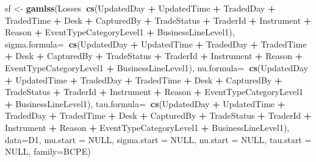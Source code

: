 \documentclass[]{article}
\newenvironment{Shaded}{\begin{snugshade}}{\end{snugshade}}
\newcommand{\KeywordTok}[1]{\textcolor[rgb]{0.13,0.29,0.53}{\textbf{#1}}}
\newcommand{\DataTypeTok}[1]{\textcolor[rgb]{0.13,0.29,0.53}{#1}}
\newcommand{\StringTok}[1]{\textcolor[rgb]{0.31,0.60,0.02}{#1}}
\newcommand{\OtherTok}[1]{\textcolor[rgb]{0.56,0.35,0.01}{#1}}
\newcommand{\OperatorTok}[1]{\textcolor[rgb]{0.81,0.36,0.00}{\textbf{#1}}}
\newcommand{\NormalTok}[1]{#1}
\begin{document}
\begin{Shaded}
\begin{Highlighting}[]
\NormalTok{sf <-}\StringTok{ }\KeywordTok{gamlss}\NormalTok{(Losses}\OperatorTok{~}\KeywordTok{cs}\NormalTok{(UpdatedDay }\OperatorTok{+}\StringTok{ }\NormalTok{UpdatedTime }\OperatorTok{+}\StringTok{ }\NormalTok{TradedDay }\OperatorTok{+}\StringTok{ }\NormalTok{TradedTime}
      \OperatorTok{+}\StringTok{ }\NormalTok{Desk }\OperatorTok{+}\StringTok{ }\NormalTok{CapturedBy }\OperatorTok{+}\StringTok{ }\NormalTok{TradeStatus }\OperatorTok{+}\StringTok{ }\NormalTok{TraderId }\OperatorTok{+}\StringTok{ }\NormalTok{Instrument }\OperatorTok{+}\StringTok{ }\NormalTok{Reason}
      \OperatorTok{+}\StringTok{ }\NormalTok{EventTypeCategoryLevel1 }\OperatorTok{+}\StringTok{ }\NormalTok{BusinessLineLevel1), }
\DataTypeTok{sigma.formula=}\OperatorTok{~}\KeywordTok{cs}\NormalTok{(UpdatedDay }\OperatorTok{+}\StringTok{ }\NormalTok{UpdatedTime }\OperatorTok{+}\StringTok{ }\NormalTok{TradedDay }\OperatorTok{+}\StringTok{ }\NormalTok{TradedTime }\OperatorTok{+}\StringTok{ }\NormalTok{Desk}
      \OperatorTok{+}\StringTok{ }\NormalTok{CapturedBy }\OperatorTok{+}\StringTok{ }\NormalTok{TradeStatus }\OperatorTok{+}\StringTok{ }\NormalTok{TraderId }\OperatorTok{+}\StringTok{ }\NormalTok{Instrument }\OperatorTok{+}\StringTok{ }\NormalTok{Reason }\OperatorTok{+}
\StringTok{        }\NormalTok{EventTypeCategoryLevel1 }\OperatorTok{+}\StringTok{ }\NormalTok{BusinessLineLevel1),}
\DataTypeTok{nu.formula=}\OperatorTok{~}\KeywordTok{cs}\NormalTok{(UpdatedDay }\OperatorTok{+}\StringTok{ }\NormalTok{UpdatedTime }\OperatorTok{+}\StringTok{ }\NormalTok{TradedDay }\OperatorTok{+}\StringTok{ }\NormalTok{TradedTime }\OperatorTok{+}\StringTok{ }\NormalTok{Desk }\OperatorTok{+}\StringTok{ }
\StringTok{      }\NormalTok{CapturedBy }\OperatorTok{+}\StringTok{ }\NormalTok{TradeStatus }\OperatorTok{+}\StringTok{ }\NormalTok{TraderId }\OperatorTok{+}\StringTok{ }\NormalTok{Instrument }\OperatorTok{+}\StringTok{ }\NormalTok{Reason }\OperatorTok{+}\StringTok{ }
\StringTok{      }\NormalTok{EventTypeCategoryLevel1 }\OperatorTok{+}\StringTok{ }\NormalTok{BusinessLineLevel1),}
 \DataTypeTok{tau.formula=}\OperatorTok{~}\KeywordTok{cs}\NormalTok{(UpdatedDay }\OperatorTok{+}\StringTok{ }\NormalTok{UpdatedTime }\OperatorTok{+}\StringTok{ }\NormalTok{TradedDay }\OperatorTok{+}\StringTok{ }\NormalTok{TradedTime }\OperatorTok{+}\StringTok{ }\NormalTok{Desk }\OperatorTok{+}
\StringTok{      }\NormalTok{CapturedBy }\OperatorTok{+}\StringTok{ }\NormalTok{TradeStatus }\OperatorTok{+}\StringTok{ }\NormalTok{TraderId }\OperatorTok{+}\StringTok{ }\NormalTok{Instrument }\OperatorTok{+}\StringTok{ }\NormalTok{Reason }\OperatorTok{+}
\StringTok{      }\NormalTok{EventTypeCategoryLevel1 }\OperatorTok{+}\StringTok{ }\NormalTok{BusinessLineLevel1),}
\DataTypeTok{data=}\NormalTok{D1, }\DataTypeTok{mu.start =} \OtherTok{NULL}\NormalTok{,  }\DataTypeTok{sigma.start =} \OtherTok{NULL}\NormalTok{, }\DataTypeTok{nu.start =} \OtherTok{NULL}\NormalTok{,}
                                            \DataTypeTok{tau.start =} \OtherTok{NULL}\NormalTok{, }\DataTypeTok{family=}\NormalTok{BCPE)}
\end{Highlighting}
\end{Shaded}

\normalsize
\end{document}
